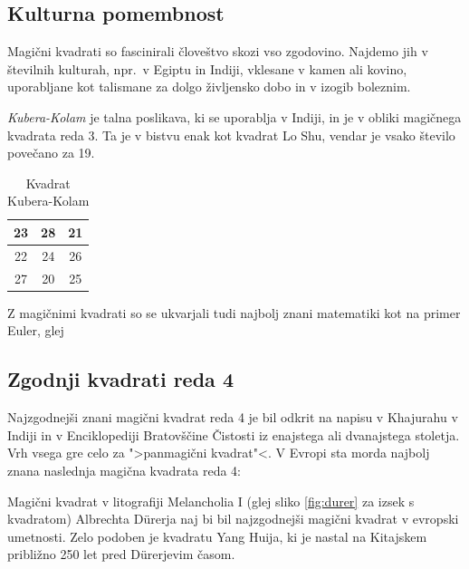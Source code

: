 \documentclass[a4paper,12pt]{article}
\newcommand{\pojem}[1]{\emph{\color{purple}#1}}
\newenvironment{magic}[3]
   {\begin{table}[h]
      \caption{#2}
      \label{#3}
      \large
      \centering
      \begin{tabular}{|*{#1}{c|}}
         \hline
   }
      {
      \end{tabular}
      \end{table}
      }
\begin{document}

\subsection{Kulturna pomembnost}

Magični kvadrati so fascinirali človeštvo skozi vso zgodovino. Najdemo jih
v številnih kulturah, npr.\ v Egiptu in Indiji, vklesane v kamen ali
kovino, uporabljane kot talismane za dolgo življensko dobo in v
izogib boleznim.

\pojem{Kubera-Kolam} je talna poslikava, ki se uporablja v Indiji, in je v
obliki magičnega kvadrata reda 3. Ta je v bistvu enak kot kvadrat
Lo Shu, vendar je vsako število povečano za 19.

\begin{magic}{3}{Kvadrat Kubera-Kolam}{table:kubera}
   23 & 28 & 21 \\\hline
   22 & 24 & 26 \\\hline
   27 & 20 & 25 \\\hline
\end{magic}

Z magičnimi kvadrati so se ukvarjali tudi najbolj znani matematiki kot na
primer Euler, glej \cite{euler} %


\subsection{Zgodnji kvadrati reda 4}

Najzgodnejši znani magični kvadrat reda 4 je bil odkrit na napisu
v Khajurahu v Indiji in v Enciklopediji Bratovščine Čistosti iz enajstega
ali dvanajstega stoletja. Vrh vsega gre celo za ">panmagični kvadrat"<.
V Evropi sta morda najbolj znana naslednja magična kvadrata reda 4:

Magični kvadrat v litografiji Melancholia I (glej sliko \ref{fig:durer}
za izsek s kvadratom) Albrechta Dürerja naj bi bil najzgodnejši magični kvadrat
v evropski umetnosti. Zelo podoben je kvadratu Yang Huija, ki je nastal na Kitajskem
približno 250 let pred Dürerjevim časom. %
\end{document}
